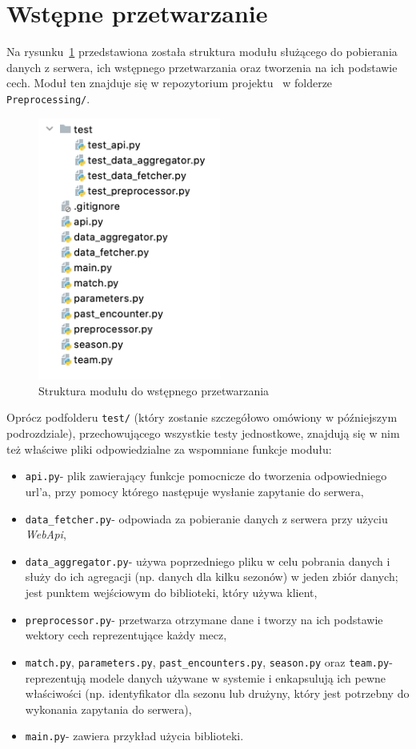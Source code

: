     \section{Wstępne przetwarzanie}
    \noindent Na rysunku~\ref{fig:preprocessing_structure} przedstawiona została struktura modułu służącego do pobierania danych z serwera, ich wstępnego przetwarzania oraz tworzenia na ich podstawie cech. Moduł ten znajduje się w repozytorium projektu~\cite{repo} w folderze \texttt{Preprocessing/}.
    \begin{figure}[H] 
        \centering\includegraphics[width=6cm]{figures/preprocessing_structure.png}
        \caption{Struktura modułu do wstępnego przetwarzania}
        \label{fig:preprocessing_structure}
    \end{figure}
    
    Oprócz podfolderu \texttt{test/} (który zostanie szczegółowo omówiony w późniejszym podrozdziale), przechowującego wszystkie testy jednostkowe, znajdują się w nim też właściwe pliki odpowiedzialne za wspomniane funkcje modułu:
    
    \begin{itemize}
        \item \texttt{api.py}- plik zawierający funkcje pomocnicze do tworzenia odpowiedniego url'a, przy pomocy którego następuje wysłanie zapytanie do serwera,
        \item \texttt{data\_fetcher.py}- odpowiada za pobieranie danych z serwera przy użyciu \emph{WebApi},
        \item \texttt{data\_aggregator.py}- używa poprzedniego pliku w celu pobrania danych i służy do ich agregacji (np. danych dla kilku sezonów) w jeden zbiór danych; jest punktem wejściowym do biblioteki, który używa klient,
        \item \texttt{preprocessor.py}- przetwarza otrzymane dane i tworzy na ich podstawie wektory cech reprezentujące każdy mecz,
        \item \texttt{match.py}, \texttt{parameters.py}, \texttt{past\_encounters.py}, \texttt{season.py} oraz \texttt{team.py}- reprezentują modele danych używane w systemie i enkapsulują ich pewne właściwości (np. identyfikator dla sezonu lub drużyny, który jest potrzebny do wykonania zapytania do serwera),
        \item \texttt{main.py}- zawiera przykład użycia biblioteki.
    \end{itemize}
    
